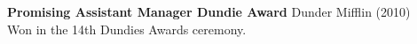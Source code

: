 \textbf{Promising Assistant Manager Dundie Award} \hfill Dunder Mifflin (2010)\\
Won in the 14th Dundies Awards ceremony.\\
\vspace*{2mm}
